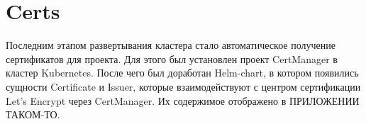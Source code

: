 \section{Certs}
\label{sec:certs}

Последним этапом развертывания кластера стало автоматическое получение сертификатов для проекта. Для этого был установлен проект CertManager в кластер Kubernetes. После чего был доработан Helm-chart, в котором появились сущности Certificate
и Issuer,
которые взаимодействуют с центром сертификации Let's Encrypt
через CertManager. Их содержимое отображено в ПРИЛОЖЕНИИ ТАКОМ-ТО.
